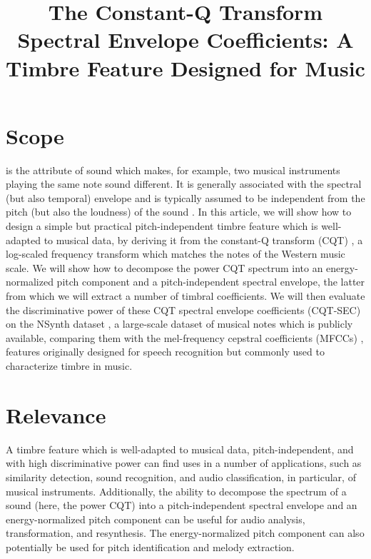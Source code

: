 \documentclass[journal]{IEEEtran}
\begin{document}
\title{The Constant-Q Transform Spectral Envelope Coefficients: A Timbre Feature Designed for Music}

\maketitle

\section{Scope}

 is the attribute of sound which makes, for example, two musical instruments playing the same note sound different. It is generally associated with the spectral (but also temporal) envelope and is typically assumed to be independent from the pitch (but also the loudness) of the sound \cite{moore2004}. In this article, we will show how to design a simple but practical pitch-independent timbre feature which is well-adapted to musical data, by deriving it from the constant-Q transform (CQT) \cite{brown1991, brown1992}, a log-scaled frequency transform which matches the notes of the Western music scale. We will show how to decompose the power CQT spectrum into an energy-normalized pitch component and a pitch-independent spectral envelope, the latter from which we will extract a number of timbral coefficients. We will then evaluate the discriminative power of these CQT spectral envelope coefficients (CQT-SEC) on the NSynth dataset \cite{engel2017}, a large-scale dataset of musical notes which is publicly available, comparing them with the mel-frequency cepstral coefficients (MFCCs) \cite{davis1980}, features originally designed for speech recognition but commonly used to characterize timbre in music. 


\section{Relevance}

A timbre feature which is well-adapted to musical data, pitch-independent, and with high discriminative power can find uses in a number of applications, such as similarity detection, sound recognition, and audio classification, in particular, of musical instruments. Additionally, the ability to decompose the spectrum of a sound (here, the power CQT) into a pitch-independent spectral envelope and an energy-normalized pitch component can be useful for audio analysis, transformation, and resynthesis. The energy-normalized pitch component can also potentially be used for pitch identification and melody extraction. 
\end{document}
